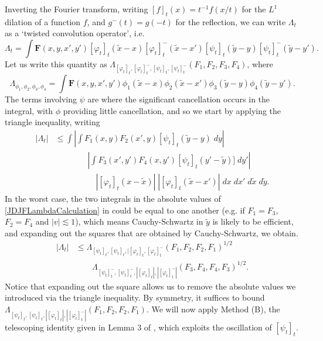 \documentclass[12pt]{article}
\newcommand*{\F}{\mathbf{F}}
\begin{document}

Inverting the Fourier transform, writing $[f]_t(x) = t^{-1} f(x/t)$ for the $L^1$ dilation of a function $f$, and $g^-(t) = g(-t)$ for the reflection, we can write $\Lambda_t$ as a `twisted convolution operator', i.e.
%
\begin{equation}
    \label{FourSpatialSideJD}
    \Lambda_t = \int \F(x,y,x',y') [\varphi_t]_t(\tilde{x} - x) [\varphi_t]_t^-(\tilde{x} - x') [\psi_t]_t(\tilde{y} - y) [\psi_t]_t^-(\tilde{y} - y').
\end{equation}
%
Let us write this quantity as $\Lambda_{[\varphi_t]_t, [\varphi_t]_t^-, [\psi_t]_t, [\psi_t]_t^-}(F_1,F_2,F_3,F_4)$, where
%
\[ \Lambda_{\phi_1,\phi_2,\phi_3,\phi_4} = \int \F(x,y,x',y') \phi_1(\tilde{x} - x) \phi_2(\tilde{x} - x') \phi_3(\tilde{y} - y) \phi_4(\tilde{y} - y').  \]
%
The terms involving $\psi$ are where the significant cancellation occurs in the integral, with $\phi$ providing little cancellation, and so we start by applying the triangle inequality, writing
%
\begin{equation} \label{JDJFLambdaCalculation}
\begin{aligned}
    |\Lambda_t| &\leq \int \left| \int F_1(x,y) F_2(x',y) [\psi_t]_t(\tilde{y} - y)\; dy \right|\\
    &\quad\quad\quad\quad \left| \int F_3(x',y') F_4(x,y') [\psi_t]_t(y' - \tilde{y})]\; dy' \right|\\
    &\quad\quad\quad\quad\quad |[\varphi_t]_t(x - \tilde{x})| \; |[\varphi_t]_t(\tilde{x} - x')|\; dx\; dx'\; d\tilde{x}\; d\tilde{y}.
\end{aligned}
\end{equation}
%
In the worst case, the two integrals in the absolute values of \eqref{JDJFLambdaCalculation} in could be equal to one another (e.g. if $F_1 = F_3$, $F_2 = F_4$ and $|v| \lesssim 1$), which means Cauchy-Schwartz in $\tilde{y}$ is likely to be efficient, and expanding out the squares that are obtained by Cauchy-Schwartz, we obtain.
%
\begin{align*}
    |\Lambda_t| &\leq \Lambda_{[\psi_t]_t, [\psi_t]_t, |[\varphi_t]_t, [\varphi_t]_t^-}(F_1,F_2,F_2,F_1)^{1/2}\\
    &\quad\quad \Lambda_{[\psi_t]_t^-, [\psi_t]_t^-, |[\varphi_t]_t|, |[\varphi_t]_t^-|}(F_3,F_4,F_4,F_3)^{1/2}.
\end{align*}
%
Notice that expanding out the square allows us to remove the absolute values we introduced via the triangle inequality. By symmetry, it suffices to bound $\Lambda_{[\psi_t]_t, [\psi_t]_t, |[\varphi_t]_t|, |[\varphi_t]_t^-|}(F_1,F_2,F_2,F_1)$. We will now apply Method (B), the telescoping identity given in Lemma 3 of \cite{dujdjf}, which exploits the oscillation of $[\psi_t]_t$.
\end{document}
